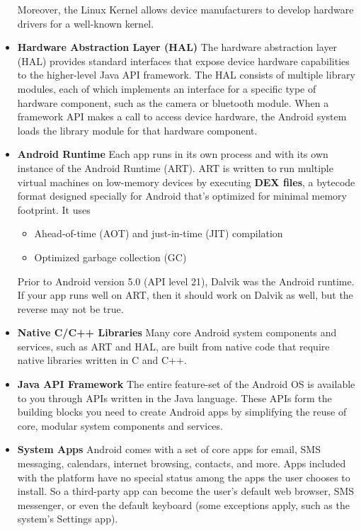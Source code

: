\begin{itemize}
	Moreover, the Linux Kernel  allows device manufacturers to develop hardware drivers for a well-known kernel.
	\item \textbf{Hardware Abstraction Layer (HAL)} The hardware abstraction layer (HAL) provides standard interfaces that expose device hardware capabilities to the higher-level Java API framework. The HAL consists of multiple library modules, each of which implements an interface for a specific type of hardware component, such as the camera or bluetooth module. When a framework API makes a call to access device hardware, the Android system loads the library module for that hardware component.
	\item \textbf{Android Runtime} Each app runs in its own process and with its own instance of the Android Runtime (ART). ART is written to run multiple virtual machines on low-memory devices by executing \textbf{DEX files}, a bytecode format designed specially for Android that's optimized for minimal memory footprint. It uses
	\begin{itemize}
		\item Ahead-of-time (AOT) and just-in-time (JIT) compilation \cite{}
		\item Optimized garbage collection (GC)
	\end{itemize}
	Prior to Android version 5.0 (API level 21), Dalvik was the Android runtime. If your app runs well on ART, then it should work on Dalvik as well, but the reverse may not be true.
	\item \textbf{Native C/C++ Libraries} Many core Android system components and services, such as ART and HAL, are built from native code that require native libraries written in C and C++. 
	\item \textbf{Java API Framework} The entire feature-set of the Android OS is available to you through APIs written in the Java language. These APIs form the building blocks you need to create Android apps by simplifying the reuse of core, modular system components and services.
	\item \textbf{System Apps} Android comes with a set of core apps for email, SMS messaging, calendars, internet browsing, contacts, and more. Apps included with the platform have no special status among the apps the user chooses to install. So a third-party app can become the user's default web browser, SMS messenger, or even the default keyboard (some exceptions apply, such as the system's Settings app).
	
\end{itemize}




